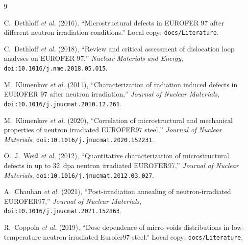 \documentclass[11pt]{article}
\begin{document}
\begin{thebibliography}{9}

 C.~Dethloff \emph{et al.} (2016), ``Microstructural
defects in EUROFER 97 after different neutron irradiation conditions.''
Local copy: \texttt{docs/Literature}.

 C.~Dethloff \emph{et al.} (2018), ``Review and critical
assessment of dislocation loop analyses on EUROFER 97,'' \emph{Nuclear
Materials and Energy}, \texttt{doi:10.1016/j.nme.2018.05.015}.

 M.~Klimenkov \emph{et al.} (2011), ``Characterization of
radiation induced defects in EUROFER 97 after neutron irradiation,''
\emph{Journal of Nuclear Materials},
\texttt{doi:10.1016/j.jnucmat.2010.12.261}.

 M.~Klimenkov \emph{et al.} (2020), ``Correlation of
microstructural and mechanical properties of neutron irradiated EUROFER97
steel,'' \emph{Journal of Nuclear Materials},
\texttt{doi:10.1016/j.jnucmat.2020.152231}.

 O.~J.~Wei\ss{} \emph{et al.} (2012), ``Quantitative
characterization of microstructural defects in up to 32~dpa neutron irradiated
EUROFER97,'' \emph{Journal of Nuclear Materials},
\texttt{doi:10.1016/j.jnucmat.2012.03.027}.

 A.~Chauhan \emph{et al.} (2021), ``Post-irradiation
annealing of neutron-irradiated EUROFER97,'' \emph{Journal of Nuclear
Materials}, \texttt{doi:10.1016/j.jnucmat.2021.152863}.

 R.~Coppola \emph{et al.} (2019), ``Dose dependence of
micro-voids distributions in low-temperature neutron irradiated Eurofer97
steel.'' Local copy: \texttt{docs/Literature}.

\end{thebibliography}
\end{document}

